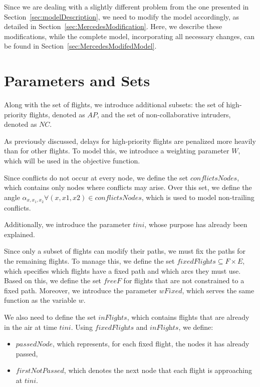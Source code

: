 \documentclass[../thesis.tex]{subfiles}
\begin{document}
Since we are dealing with a slightly different problem from the one presented in Section~\ref{sec:modelDescription}, we need to modify the model accordingly, as detailed in Section~\ref{sec:MercedesModification}.  
Here, we describe these modifications, while the complete model, incorporating all necessary changes, can be found in Section~\ref{sec:MercedesModifedModel}.

\section{Parameters and Sets}

Along with the set of flights, we introduce additional subsets: the set of high-priority flights, denoted as \( AP \), and the set of non-collaborative intruders, denoted as \( NC \).  

As previously discussed, delays for high-priority flights are penalized more heavily than for other flights. To model this, we introduce a weighting parameter \( W \), which will be used in the objective function.  

Since conflicts do not occur at every node, we define the set \( \textit{conflictsNodes} \), which contains only nodes where conflicts may arise. Over this set, we define the angle \( \alpha_{x,x_1,x_2} \forall (x,x1,x2)\in conflictsNodes \), which is used to model non-trailing conflicts.  

Additionally, we introduce the parameter \( tini \), whose purpose has already been explained.  

Since only a subset of flights can modify their paths, we must fix the paths for the remaining flights. To manage this, we define the set \( \textit{fixedFlights} \subseteq F \times E \), which specifies which flights have a fixed path and which arcs they must use. Based on this, we define the set \( \textit{freeF} \) for flights that are not constrained to a fixed path. 
Moreover, we introduce the parameter \( wFixed \), which serves the same function as the variable \( w \).  

We also need to define the set \( \textit{inFlights} \), which contains flights that are already in the air at time \( tini \). Using \( \textit{fixedFlights} \) and \( \textit{inFlights} \), we define:  
\begin{itemize}
    \item \( \textit{passedNode} \), which represents, for each fixed flight, the nodes it has already passed,  
    \item  \( \textit{firstNotPassed} \), which denotes the next node that each flight is approaching at \( tini \).  
\end{itemize}
\end{document}
